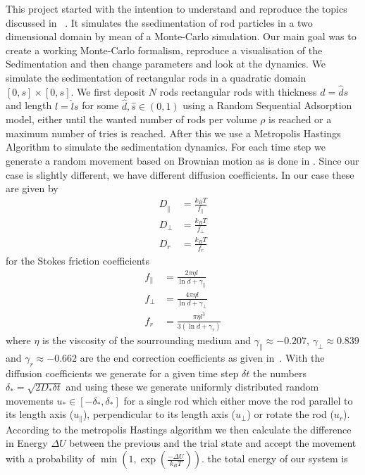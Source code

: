 This project started with the intention to understand and reproduce the topics discussed in ~\cite{SED}. It simulates the ssedimentation of rod particles in a two dimensional domain by mean of a Monte-Carlo simulation. Our main goal was to create a working Monte-Carlo formalism, reproduce a visualisation of the Sedimentation and then change parameters and look at the dynamics.
We simulate the sedimentation of rectangular rods in a quadratic domain $[0,s]×[0,s]$. We first deposit $N$ rods rectangular rods with thickness $d = \hat ds$ and length $l = \hat ls$ for some $\hat d,\hat s∈(0,1)$ using a Random Sequential Adsorption model, either until the wanted number of rods per volume $ρ$ is reached or a maximum number of tries is reached. After this we use a Metropolis Hastings Algorithm to simulate the sedimentation dynamics. For each time step we generate a random movement based on Brownian motion as is done in \cite{BD}. Since our case is slightly different, we have different diffusion coefficients. In our case these are given by
\begin{equation}
  \begin{array}{RLL}
    D_‖ &= \frac{k_BT}{f_\|}\\
    D_\perp &= \frac{k_BT}{f_\perp}\\
    D_r &= \frac{k_BT}{f_r}
  \end{array}
\end{equation}
for the Stokes friction coefficients
\begin{equation}
  \begin{array}{RLL}
    f_\| &= \frac{2πηl}{\ln d + γ_\|}\\
    f_\perp &= \frac{4πηl}{\ln d + γ_\perp}\\
    f_r &= \frac{πηl^3}{3(\ln d+γ_r)}
  \end{array}
\end{equation}
where $η$ is the viscosity of the sourrounding medium and $γ_\| \approx -0.207$, $γ_\perp\approx0.839$ and $γ_r\approx-0.662$ are the end correction coefficients as given in~\cite{SED}.
With the diffusion coefficients we generate for a given time step $δt$ the numbers $δ_* = \sqrt{2D_*δt}$ and using these we generate uniformly distributed random movements $u_*∈[-δ_*,δ_*]$ for a single rod which either move the rod parallel to its length axis ($u_\|$), perpendicular to its length axis ($u_\perp$) or rotate the rod ($u_r$). According to the metropolis Hastings algorithm we then calculate the difference in Energy $ΔU$ between the previous and the trial state and accept the movement with a probability of $\min(1,\exp(\frac{-ΔU}{k_BT}))$. the total energy of our system is
